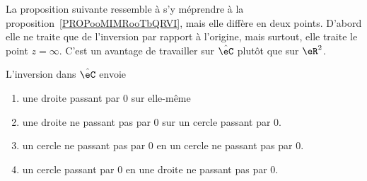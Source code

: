 La proposition suivante ressemble à s'y méprendre à la proposition~\ref{PROPooMIMRooTbQRVI}, mais elle diffère en deux points. D'abord elle ne traite que de l'inversion par rapport à l'origine, mais surtout, elle traite le point \( z=\infty\). C'est un avantage de travailler sur \( \hat \eC\) plutôt que sur \( \eR^2\).
\begin{proposition}     \label{PROPooEAKXooUIqWEv}
    L'inversion dans \( \hat \eC\) envoie
    \begin{enumerate}
        \item
            une droite passant par \( 0\) sur elle-même
        \item
            une droite ne passant pas par \( 0\) sur un cercle passant par \( 0\).
        \item
            un cercle ne passant pas par \( 0\) en un cercle ne passant pas par \( 0\).
        \item
            un cercle passant par \( 0\) en une droite ne passant pas par \( 0\).
    \end{enumerate}
\end{proposition}

